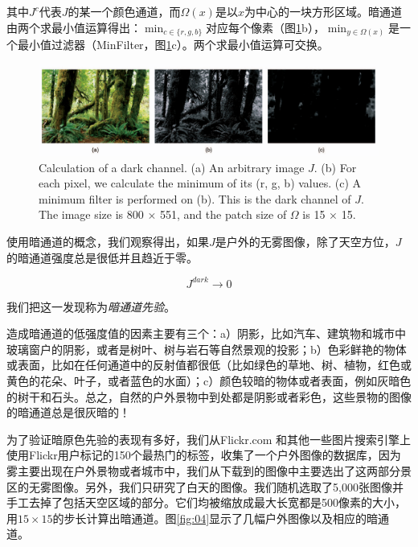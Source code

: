 \documentclass{ctexart}
\begin{document}
其中$J^c$代表$J$的某一个颜色通道，而$\Omega(x)$是以$x$为中心的一块方形区域。暗通道由两个求最小值运算得出：$\min_{c \in \{ r, g, b\}}$对应每个像素（图\ref{fig:03}b），$\min_{y \in \Omega(x)}$是一个最小值过滤器（MinFilter，图\ref{fig:03}c）。两个求最小值运算可交换。\par

\begin{figure}[tbp]
	\centering
	\includegraphics[width=\textwidth]{img/03.png}
	\caption{Calculation of a dark channel. (a) An arbitrary image $J$. (b) For each pixel, we calculate the minimum of its (r, g, b) values. (c) A minimum filter is performed on (b). This is the dark channel of $J$. The image size is 800 $\times$ 551, and the patch size of $\Omega$ is 15 $\times$ 15.}\label{fig:03}
\end{figure}

使用暗通道的概念，我们观察得出，如果$J$是户外的无雾图像，除了天空方位，$J$的暗通道强度总是很低并且趋近于零。

\begin{equation}\label{equ:6}
	J^{dark} \to 0
\end{equation}

我们把这一发现称为\emph{暗通道先验}。\par

造成暗通道的低强度值的因素主要有三个：a）阴影，比如汽车、建筑物和城市中玻璃窗户的阴影，或者是树叶、树与岩石等自然景观的投影；b）色彩鲜艳的物体或表面，比如在任何通道中的反射值都很低（比如绿色的草地、树、植物，红色或黄色的花朵、叶子，或者蓝色的水面）；c）颜色较暗的物体或者表面，例如灰暗色的树干和石头。总之，自然的户外景物中到处都是阴影或者彩色，这些景物的图像的暗通道总是很灰暗的！\par

为了验证暗原色先验的表现有多好，我们从Flickr.com 和其他一些图片搜索引擎上使用Flickr用户标记的150个最热门的标签，收集了一个户外图像的数据库，因为雾主要出现在户外景物或者城市中，我们从下载到的图像中主要选出了这两部分景区的无雾图像。另外，我们只研究了白天的图像。我们随机选取了5,000张图像并手工去掉了包括天空区域的部分。它们均被缩放成最大长宽都是500像素的大小，用$15 \times 15$的步长计算出暗通道。图\ref{fig:04}显示了几幅户外图像以及相应的暗通道。\par
\end{document}
